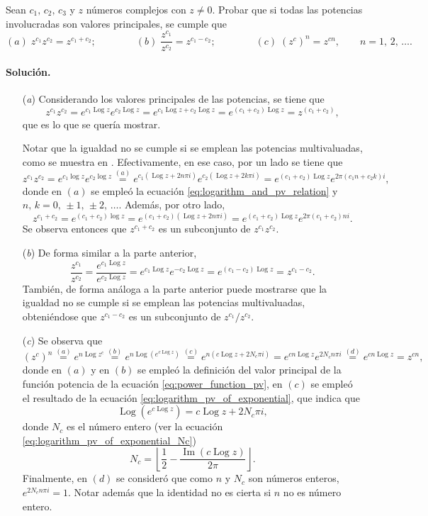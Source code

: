 \documentclass[a4paper]{report}
\renewcommand{\Im}{\operatorname{Im}}
\DeclareMathOperator{\Log}{Log}
\begin{document}
Sean \(c_1,\,c_2,\,c_3\) y \(z\) números complejos con \(z\neq0\). Probar que si todas las potencias involucradas son valores principales, se cumple que 
\[
 (\textit{a})\;z^{c_1}z^{c_2}=z^{c_1+c_2};\qquad\qquad 
 (\textit{b})\;\frac{z^{c_1}}{z^{c_2}}=z^{c_1-c_2};\qquad\qquad
 (\textit{c})\;(z^c)^n=z^{cn},\qquad n=1,\,2,\,\dots.
\]

\paragraph{Solución.} 

\begin{enumerate}
 \item[(\textit{a})] Considerando los valores principales de las potencias, se tiene que 
 \[
  z^{c_1}z^{c_2}=e^{c_1\Log z}e^{c_2\Log z}=e^{c_1\Log z+c_2\Log z}=e^{(c_1+c_2)\Log z}=z^(c_1+c_2),
 \]
 que es lo que se quería mostrar. 
 
 Notar que la igualdad no se cumple si se emplean las potencias multivaluadas, como se muestra en \cite{haber2019complex}. Efectivamente, en ese caso, por un lado se tiene que 
 \[
  z^{c_1}z^{c_2}=e^{c_1\log z}e^{c_2\log z}\overset{(a)}{=}e^{c_1(\Log z+2n\pi i)}e^{c_2(\Log z+2k\pi i)}
   =e^{(c_1+c_2)\Log z}e^{2\pi(c_1n+c_2k)i},
 \]
 donde en \((a)\) se empleó la ecuación \ref{eq:logarithm_and_pv_relation} y \(n,\,k=0,\,\pm1,\,\pm2,\,\dots\). Además, por otro lado,
 \[
  z^{c_1+c_2}=e^{(c_1+c_2)\log z}=e^{(c_1+c_2)(\Log z+2n\pi i)}=e^{(c_1+c_2)\Log z}e^{2\pi(c_1+c_2)ni}.
 \]
 Se observa entonces que \(z^{c_1+c_2}\) es un subconjunto de \(z^{c_1}z^{c_2}\).
 \item[(\textit{b})] De forma similar a la parte anterior,
 \[
  \frac{z^{c_1}}{z^{c_2}}=\frac{e^{c_1\Log z}}{e^{c_2\Log z}}=e^{c_1\Log z}e^{-c_2\Log z}=e^{(c_1-c_2)\Log z}=z^{c_1-c_2}.
 \]
 También, de forma análoga a la parte anterior puede mostrarse que la igualdad no se cumple si se emplean las potencias multivaluadas, obteniéndose que \(z^{c_1-c_2}\) es un subconjunto de \(z^{c_1}/z^{c_2}\).
 \item[(\textit{c})] Se observa que 
 \[
  (z^c)^n\overset{(a)}{=}e^{n\Log z^c}\overset{(b)}{=}e^{n\Log(e^{c\Log z})}
  \overset{(c)}{=}e^{n(c\Log z+2N_c\pi i)}
  =e^{cn\Log z}e^{2N_cn\pi i}
  \overset{(d)}{=}e^{cn\Log z}
  =z^{cn},
 \]
 donde en \((a)\) y en \((b)\) se empleó la definición del valor principal de la función potencia de la ecuación \ref{eq:power_function_pv}, en \((c)\) se empleó el resultado de la ecuación \ref{eq:logarithm_pv_of_exponential}, que indica que
 \[
  \Log(e^{c\Log z})=c\Log z+2N_c\pi i,  
 \]
 donde \(N_c\) es el número entero (ver la ecuación \ref{eq:logarithm_pv_of_exponential_Nc})
 \[
  N_c=\left\lfloor\frac{1}{2}-\frac{\Im(c\Log z)}{2\pi}\right\rfloor.
 \]
 Finalmente, en \((d)\) se consideró que como \(n\) y \(N_c\) son números enteros, \(e^{2N_cn\pi i}=1\). Notar además que la identidad no es cierta si \(n\) no es número entero.
 

\end{enumerate}
\end{document}
